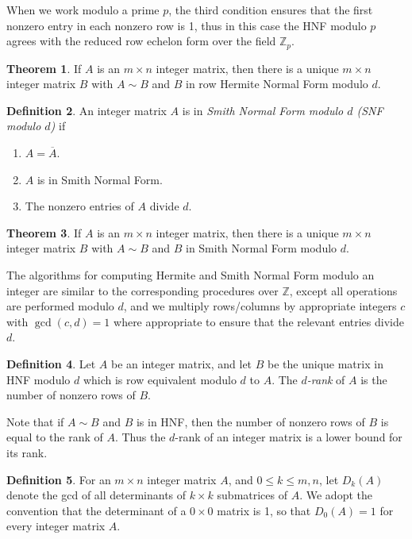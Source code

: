 \documentclass[12pt,a4paper,answers]{exam}
\newcommand{\Z}{\mathbb{Z}}
\theoremstyle{definition}
\newtheorem{theorem}{Theorem}[section]
\newtheorem{definition}[theorem]{Definition}
\begin{document}
When we work modulo a prime $p$, the third condition ensures that the first nonzero entry in each nonzero row is 1, thus in this case the HNF modulo $p$ agrees with the reduced row echelon form over the field $\Z_p$.

\begin{theorem}
  If $A$ is an $m\times n$ integer matrix, then there is a unique $m\times n$ integer matrix $B$ with $A\sim B$ and $B$ in row Hermite Normal Form modulo $d$.
\end{theorem}

\begin{definition}
  An integer matrix $A$ is in \emph{Smith Normal Form modulo $d$ (SNF modulo $d$)} if
  \begin{enumerate}
  \item $A=\overline{A}$.
  \item $A$ is in Smith Normal Form.
  \item The nonzero entries of $A$ divide $d$.
  \end{enumerate}
\end{definition}

\begin{theorem}
  If $A$ is an $m\times n$ integer matrix, then there is a unique $m\times n$ integer matrix $B$ with $A\sim B$ and $B$ in Smith Normal Form modulo $d$.
\end{theorem}

The algorithms for computing Hermite and Smith Normal Form modulo an integer are similar to the corresponding procedures over $\Z$, except all operations are performed modulo $d$, and we multiply rows/columns by appropriate integers $c$ with $\gcd(c,d)=1$ where appropriate to ensure that the relevant entries divide $d$.

\begin{definition}
  Let $A$ be an integer matrix, and let $B$ be the unique matrix in HNF modulo $d$ which is row equivalent modulo $d$ to $A$. The \emph{$d$-rank} of $A$ is the number of nonzero rows of $B$.
\end{definition}

Note that if $A\sim B$ and $B$ is in HNF, then the number of nonzero rows of $B$ is equal to the rank of $A$. Thus the $d$-rank of an integer matrix is a lower bound for its rank.

\begin{definition}
  For an $m\times n$ integer matrix $A$, and $0\leq k\leq m,n$, let $D_k(A)$ denote the gcd of all determinants of $k\times k$ submatrices of $A$. We adopt the convention that the determinant of a $0\times0$ matrix is 1, so that $D_0(A)=1$ for every integer matrix $A$.
\end{definition}
\end{document}
